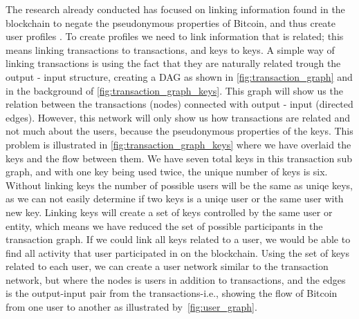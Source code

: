 The research already conducted has focused on linking information found in the blockchain to negate the pseudonymous properties of Bitcoin, and thus create user profiles \cite{meiklejohn2013fistful,androulaki2013evaluating,reid2013analysis,ron2013quantitative}. To create profiles we need to link information that is related; this means linking transactions to transactions, and keys to keys. A simple way of linking transactions is using the fact that they are naturally related trough the output - input structure, creating a DAG as shown in \cref{fig:transaction_graph} and in the background of \cref{fig:transaction_graph_keys}. This graph will show us the relation between the transactions (nodes) connected with output - input (directed edges). However, this network will only show us how transactions are related and not much about the users, because the pseudonymous properties of the keys. This problem is illustrated in \cref{fig:transaction_graph_keys} where we have overlaid the keys and the flow between them. We have seven total keys in this transaction sub graph, and with one key being used twice, the unique number of keys is six. Without linking keys the number of possible users will be the same as uniqe keys, as we can not easily determine if two keys is a uniqe user or the same user with  new key. Linking keys will create a set of keys controlled by the same user or entity, which means we have reduced the set of possible participants in the transaction graph. If we could link all keys related to a user, we would be able to find all activity that user participated in on the blockchain. Using the set of keys related to each user, we can create a user network similar to the transaction network, but where the nodes is users in addition to transactions, and the edges is the output-input pair from the transactions-i.e., showing the flow of Bitcoin from one user to another as illustrated by~\cref{fig:user_graph}. 
